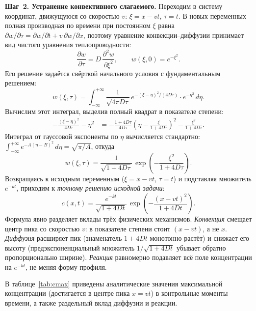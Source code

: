        \textbf{Шаг~2. Устранение конвективного слагаемого.}
        Переходим в систему координат, движущуюся со скоростью $v$:
        $\xi = x - vt$, $\tau = t$.
        В новых переменных полная производная по времени при постоянном $\xi$
        равна $\partial w/\partial \tau = \partial w / \partial t + v\,\partial w / \partial x$,
        поэтому уравнение конвекции--диффузии принимает вид чистого уравнения теплопроводности:
        \[
            \frac{\partial w}{\partial \tau}
            = D\,\frac{\partial^2 w}{\partial \xi^2}, \qquad
            w(\xi, 0) = e^{-\xi^2}.
        \]
        Его решение задаётся свёрткой начального условия с фундаментальным решением:
        \[
            w(\xi, \tau)
            = \int_{-\infty}^{+\infty}
              \frac{1}{\sqrt{4\pi D\tau}}\,
              e^{-(\xi-\eta)^2/(4D\tau)}\cdot
              e^{-\eta^2}\,d\eta.
        \]
        Вычислим этот интеграл, выделив полный квадрат в показателе степени:
        \begin{align*}
            -\frac{(\xi-\eta)^2}{4D\tau} - \eta^2
            &= -\frac{1+4D\tau}{4D\tau}
              \left(\eta - \frac{\xi}{1+4D\tau}\right)^{\!2}
              - \frac{\xi^2}{1+4D\tau}.
        \end{align*}
        Интеграл от гауссовой экспоненты по $\eta$ вычисляется стандартно:
        $\int_{-\infty}^{+\infty} e^{-A(\eta - B)^2}\,d\eta = \sqrt{\pi/A}$,
        откуда
        \[
            w(\xi, \tau)
            = \frac{1}{\sqrt{1+4D\tau}}\,
              \exp\!\left(-\frac{\xi^2}{1+4D\tau}\right).
        \]
        Возвращаясь к исходным переменным ($\xi = x - vt$, $\tau = t$) и
        подставляя множитель $e^{-kt}$, приходим к \textit{точному решению
        исходной задачи}:
        \[
            \boxed{
                c(x, t)
                = \frac{e^{-kt}}{\sqrt{1+4Dt}}\,
                  \exp\!\!\left(-\frac{(x - vt)^2}{1+4Dt}\right).
            }
        \]
        Формула явно разделяет вклады трёх физических механизмов.
        \textit{Конвекция} смещает центр пика со скоростью $v$: в показателе
        степени стоит $(x - vt)$, а не $x$.
        \textit{Диффузия} расширяет пик (знаменатель $1 + 4Dt$ монотонно растёт)
        и снижает его высоту (предэкспоненциальный множитель $1/\sqrt{1+4Dt}$
        убывает обратно пропорционально ширине).
        \textit{Реакция} равномерно подавляет всё поле концентрации на $e^{-kt}$,
        не меняя форму профиля.

        В таблице~\ref{tab:cmax} приведены аналитические значения максимальной
        концентрации (достигается в центре пика $x = vt$) в контрольные моменты
        времени, а также раздельный вклад диффузии и реакции.

